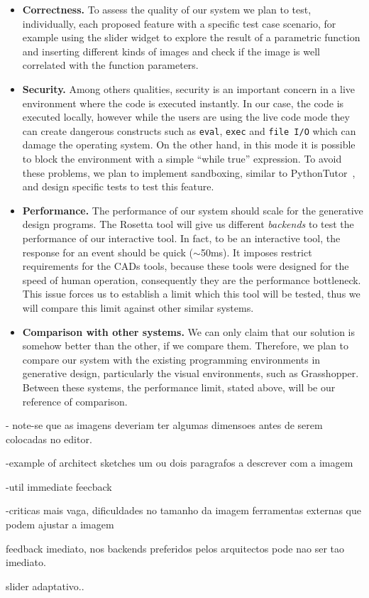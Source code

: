 \begin{itemize}
\item \textbf{Correctness.} To assess the quality of our system we plan to test, individually, each proposed feature with a specific test case scenario, for example using the slider widget to explore the result of a parametric function and inserting different kinds of images and check if the image is well correlated with the function parameters. 

\item \textbf{Security.} Among others qualities, security is an important concern in a live environment where the code is executed instantly. In our case, the code is executed locally, however while the users are using the live code mode they can create dangerous constructs such as \texttt{eval}, \texttt{exec} and \texttt{file I/O} which can damage the operating system. On the other hand, in this mode it is possible to block the environment with a simple ``while true'' expression. To avoid these problems, we plan to implement sandboxing, similar to PythonTutor~\citep{GuoSIGCSE2013}, and design specific tests to test this feature.

\item \textbf{Performance.} The performance of our system should scale for the generative design programs. The Rosetta tool will give us different \textit{backends} to test the performance of our interactive tool. In fact, to be an interactive tool, the response for an event should be quick ($\sim$50ms). It imposes restrict requirements for the CADs tools, because these tools were designed for the speed of human operation, consequently they are the performance bottleneck. This issue forces us to establish a limit which this tool will be tested, thus we will compare this limit against other similar systems.

\item \textbf{Comparison with other systems.} We can only claim that our solution is somehow better than the other, if we compare them. Therefore, we plan to compare our system with the existing programming environments in generative design, particularly the visual environments, such as Grasshopper. Between these systems, the performance limit, stated above, will be our reference of comparison.
\end{itemize}



- note-se que as imagens deveriam ter algumas dimensoes
  antes de serem colocadas no editor.
  
-example of architect sketches
 um ou dois paragrafos a descrever
 com a imagem 

-util immediate feecback

-criticas
 mais vaga, dificuldades no tamanho da imagem
 ferramentas externas que podem ajustar a imagem
 
 feedback imediato, nos backends preferidos pelos
 arquitectos pode nao ser tao imediato.

 slider adaptativo..
